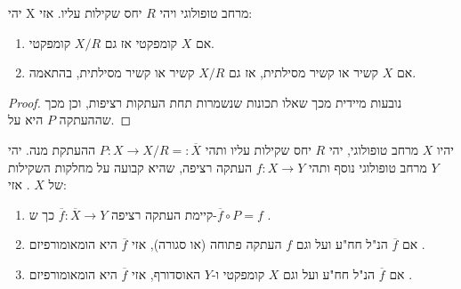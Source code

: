 \documentclass{tstextbook}
\begin{document}
\begin{lemma}
יהי X מרחב טופולוגי ויהי \(R\) יחס שקילות עליו. אזי:

  \begin{enumerate}
    \item אם \(X\) קומפקטי אז גם \(X/R\) קומפקטי. 


    \item אם \(X\) קשיר או קשיר מסילתית, אז גם \(X/R\) קשיר או קשיר מסילתית, בהתאמה. 


  \end{enumerate}
\end{lemma}
\begin{proof}
נובעות מיידית מכך שאלו תכונות שנשמרות תחת העתקות רציפות, וכן מכך שההעתקה \(P\) היא על.

\end{proof}
\begin{lemma}
יהיו \(X\) מרחב טופולוגי, יהי \(R\) יחס שקילות עליו ותהי \(P:X\rightarrow X/R=:\overline{X}\) ההעתקת מנה.
יהי \(Y\) מרחב טופולוגי נוסף ותהי \(f:X\rightarrow Y\) העתקה רציפה, שהיא קבועה על מחלקות השקילות של \(X\) . אזי:

  \begin{enumerate}
    \item קיימת העתקה רציפה \(\overline{f}:\overline{X}\rightarrow Y\) כך ש-\(\overline{f}\circ P=f\) . 


    \item אם \(\overline{f}\) הנ"ל חח"ע ועל וגם \(f\) העתקה פתוחה (או סגורה), אזי \(\overline{f}\) היא הומאומורפיזם . 


    \item אם \(\overline{f}\) הנ"ל חח"ע ועל וגם \(X\) קומפקטי ו-\(Y\) האוסדורף, אזי \(\overline{f}\) היא הומאומורפיזם . 


  \end{enumerate}
\end{lemma}
\end{document}

